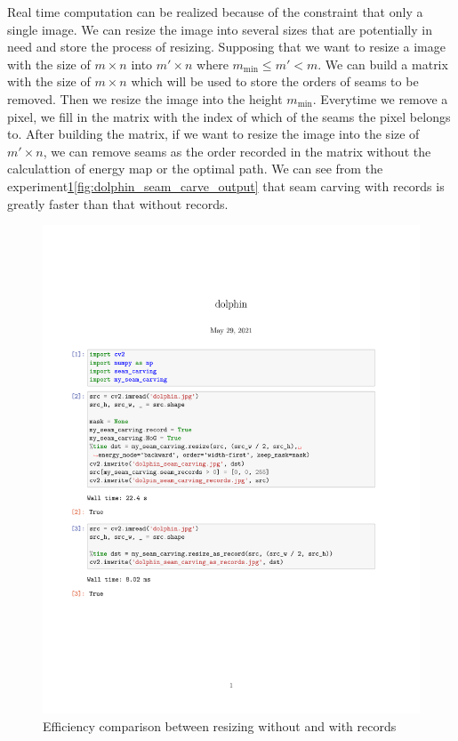 \documentclass[final]{cvpr}
\begin{document}
Real time computation can be realized because of the constraint that only a single image.
We can resize the image into several sizes that are potentially in need and store the process of resizing.
Supposing that we want to resize a image with the size of $m\times n$ into $m'\times n$ where $m_{\min}\le m'<m$.
We can build a matrix with the size of $m\times n$ which will be used to store the orders of seams to be removed.
Then we resize the image into the height $m_{\min}$.
Everytime we remove a pixel, we fill in the matrix with the index of which of the seams the pixel belongs to.
After building the matrix, if we want to resize the image into the size of $m'\times n$, we can remove seams as the order recorded in the matrix without the calculattion of energy map or the optimal path.
We can see from the experiment\ref{fig:dolphin_seam_carve}\ref{fig:dolphin_seam_carve_output} that seam carving with records is greatly faster than that without records.
\begin{figure}[htb]
\begin{center}
    \includegraphics[width=\linewidth]{dolphin.pdf}
\end{center}
\caption{Efficiency comparison between resizing without and with records}
\label{fig:dolphin_seam_carve}
\end{figure}
\end{document}
